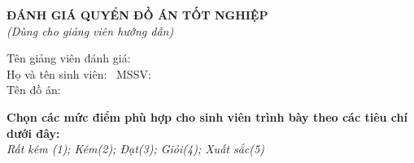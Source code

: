 \thispagestyle{empty}
\begin{center}
    \textbf{\fontsize{14pt}{16pt}\selectfont ĐÁNH GIÁ QUYỂN ĐỒ ÁN TỐT NGHIỆP}\\
    \textit{\fontsize{12pt}{14pt}\selectfont (Dùng cho giảng viên hướng dẫn)}
\end{center}

\vspace{10pt}
\noindent Tên giảng viên đánh giá: \dotfill \\
Họ và tên sinh viên: \dotfill\ MSSV: \makebox[2.5cm]{\dotfill} \\
Tên đồ án: \dotfill \\
\makebox[\textwidth]{\dotfill}

\vspace{10pt}
\noindent \textbf{Chọn các mức điểm phù hợp cho sinh viên trình bày theo các tiêu chí dưới đây:}\\
\textit{Rất kém (1); Kém(2); Đạt(3); Giỏi(4); Xuất sắc(5)}

